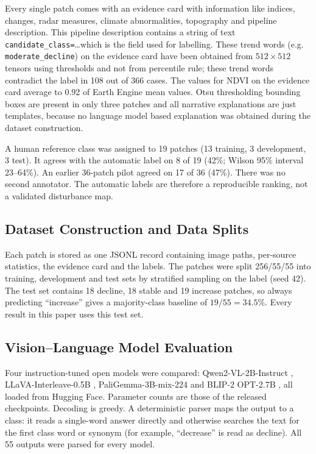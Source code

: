 \documentclass[11pt]{article}
\begin{document}
Every single patch comes with an evidence card with information like
indices, changes, radar measures, climate abnormalities, topography and
pipeline description. This pipeline description contains a string of
text \texttt{candidate\_class=}\ldots which is the field used for
labelling. These trend words (e.g.
\texttt{moderate\_decline}) on the evidence card have been obtained
from $512 \times 512$ tensors using thresholds and not from percentile
rule; these trend words contradict the label in 108 out of 366 cases.
The values for NDVI on the evidence card average to 0.92 of Earth
Engine mean values. Otsu thresholding bounding boxes are present in
only three patches and all narrative explanations are just templates,
because no language model based explanation was obtained during the
dataset construction.

A human reference class was assigned to 19 patches (13 training, 3
development, 3 test). It agrees with the automatic label on 8 of 19
(42\%; Wilson 95\% interval 23--64\%). An earlier
36-patch pilot agreed on 17 of 36 (47\%). There was no second
annotator. The automatic labels are therefore a reproducible ranking,
not a validated disturbance map.

\subsection{Dataset Construction and Data Splits}

Each patch is stored as one JSONL record containing image paths,
per-source statistics, the evidence card and the labels. The patches
were split 256/55/55 into training, development and test sets by
stratified sampling on the label (seed 42). The test set contains 18
decline, 18 stable and 19 increase patches, so always predicting
``increase'' gives a majority-class baseline of $19/55 = 34.5\%$. Every
result in this paper uses this test set.

\subsection{Vision--Language Model Evaluation}

Four instruction-tuned open models were compared:
Qwen2-VL-2B-Instruct ,
LLaVA-Interleave-0.5B ,
PaliGemma-3B-mix-224  and
BLIP-2 OPT-2.7B , all loaded from
Hugging Face. Parameter counts are those of the released checkpoints.
Decoding is greedy. A deterministic parser maps the output to a class:
it reads a single-word answer directly and otherwise searches the text
for the first class word or synonym (for example, ``decrease'' is read
as decline). All 55 outputs were parsed for every model.
\end{document}
